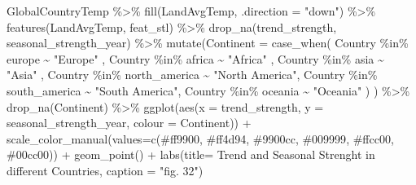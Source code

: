 \documentclass[
]{article}
\newenvironment{Shaded}{\begin{snugshade}}{\end{snugshade}}
\newcommand{\AttributeTok}[1]{\textcolor[rgb]{0.77,0.63,0.00}{#1}}
\newcommand{\FunctionTok}[1]{\textcolor[rgb]{0.00,0.00,0.00}{#1}}
\newcommand{\NormalTok}[1]{#1}
\newcommand{\SpecialCharTok}[1]{\textcolor[rgb]{0.00,0.00,0.00}{#1}}
\newcommand{\StringTok}[1]{\textcolor[rgb]{0.31,0.60,0.02}{#1}}
\begin{document}
\begin{Shaded}
\begin{Highlighting}[]
\NormalTok{GlobalCountryTemp }\SpecialCharTok{\%\textgreater{}\%} 
  \FunctionTok{fill}\NormalTok{(LandAvgTemp, }\AttributeTok{.direction =} \StringTok{"down"}\NormalTok{) }\SpecialCharTok{\%\textgreater{}\%}
  \FunctionTok{features}\NormalTok{(LandAvgTemp, feat\_stl) }\SpecialCharTok{\%\textgreater{}\%}
  \FunctionTok{drop\_na}\NormalTok{(trend\_strength, seasonal\_strength\_year) }\SpecialCharTok{\%\textgreater{}\%}
  \FunctionTok{mutate}\NormalTok{(}\AttributeTok{Continent =} \FunctionTok{case\_when}\NormalTok{(}
\NormalTok{    Country }\SpecialCharTok{\%in\%}\NormalTok{ europe  }\SpecialCharTok{\textasciitilde{}} \StringTok{"Europe"}\NormalTok{ ,}
\NormalTok{    Country }\SpecialCharTok{\%in\%}\NormalTok{ africa  }\SpecialCharTok{\textasciitilde{}} \StringTok{"Africa"}\NormalTok{ ,}
\NormalTok{    Country }\SpecialCharTok{\%in\%}\NormalTok{ asia  }\SpecialCharTok{\textasciitilde{}} \StringTok{"Asia"}\NormalTok{ ,}
\NormalTok{    Country }\SpecialCharTok{\%in\%}\NormalTok{ north\_america  }\SpecialCharTok{\textasciitilde{}} \StringTok{"North America"}\NormalTok{,}
\NormalTok{    Country }\SpecialCharTok{\%in\%}\NormalTok{ south\_america  }\SpecialCharTok{\textasciitilde{}} \StringTok{"South America"}\NormalTok{,}
\NormalTok{    Country }\SpecialCharTok{\%in\%}\NormalTok{ oceania  }\SpecialCharTok{\textasciitilde{}} \StringTok{"Oceania"}
\NormalTok{  )}
\NormalTok{) }\SpecialCharTok{\%\textgreater{}\%}
  \FunctionTok{drop\_na}\NormalTok{(Continent) }\SpecialCharTok{\%\textgreater{}\%}
  \FunctionTok{ggplot}\NormalTok{(}\FunctionTok{aes}\NormalTok{(}\AttributeTok{x =}\NormalTok{ trend\_strength, }\AttributeTok{y =}\NormalTok{ seasonal\_strength\_year, }\AttributeTok{colour =}\NormalTok{ Continent)) }\SpecialCharTok{+}
  \FunctionTok{scale\_color\_manual}\NormalTok{(}\AttributeTok{values=}\FunctionTok{c}\NormalTok{(}\StringTok{\textquotesingle{}\#ff9900\textquotesingle{}}\NormalTok{, }\StringTok{\textquotesingle{}\#ff4d94\textquotesingle{}}\NormalTok{, }\StringTok{\textquotesingle{}\#9900cc\textquotesingle{}}\NormalTok{, }\StringTok{\textquotesingle{}\#009999\textquotesingle{}}\NormalTok{, }\StringTok{\textquotesingle{}\#ffcc00\textquotesingle{}}\NormalTok{, }\StringTok{\textquotesingle{}\#00cc00\textquotesingle{}}\NormalTok{)) }\SpecialCharTok{+}
  \FunctionTok{geom\_point}\NormalTok{() }\SpecialCharTok{+}
  \FunctionTok{labs}\NormalTok{(}\AttributeTok{title=} \StringTok{\textquotesingle{}Trend and Seasonal Strenght in different Countries\textquotesingle{}}\NormalTok{, }\AttributeTok{caption =} \StringTok{"fig. 32"}\NormalTok{)}
\end{Highlighting}
\end{Shaded}
\end{document}
